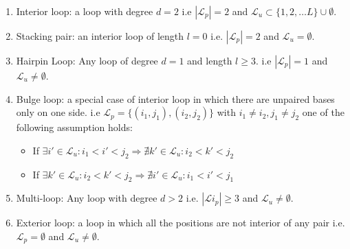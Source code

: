 \reversemarginpar
{}
\begin{enumerate}
	\item Interior loop: a loop with degree $d=2$ i.e $|\mathcal{L}_p|=2$ and $\mathcal{L}_u \subset \{1,2,\dots L\}\cup \emptyset$.
	\item Stacking pair: an interior loop of length $l=0$ i.e. $|\mathcal{L}_p|=2$ and $\mathcal{L}_u = \emptyset$.
	\item Hairpin Loop: Any loop of degree $d=1$ and length $l \geq 3$.  i.e $|\mathcal{L}_p|=1$ and  $\mathcal{L}_u \neq \emptyset$.
	\item Bulge loop: a special case of interior loop in which there are unpaired bases only on one side. i.e  $\mathcal{L}_p=\{(i_1,j_1), (i_2, j_2)\}$ with $i_1 \neq i_2, j_1\neq j_2$ one of the following assumption holds: 
		\begin{itemize}
			\item If $\exists i'\in \mathcal{L}_u \colon i_1<i'<j_2 \Rightarrow \nexists k'\in \mathcal{L}_u \colon i_2<k'<j_2$ 
			\item If $\exists k'\in \mathcal{L}_u \colon i_2<k'<j_2 \Rightarrow \nexists i'\in \mathcal{L}_u \colon i_1<i'<j_1$ 
		\end{itemize}
	\item Multi-loop: Any loop with degree $d>2$ i.e.  $|\mathcal{L}i_p| \geq 3$  and $\mathcal{L}_u \neq \emptyset$.
	\item Exterior loop: a loop in which all the positions are not interior of any pair i.e. $\mathcal{L}_p=\emptyset$ and $\mathcal{L}_u \neq \emptyset$.
\end{enumerate}

